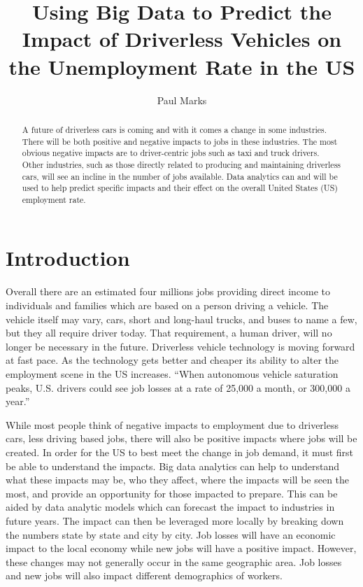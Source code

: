 \documentclass[sigconf]{acmart}
\begin{document}
\title{Using Big Data to Predict the Impact of Driverless Vehicles on the 
Unemployment Rate in the US}


\author{Paul Marks}


\begin{abstract}
A future of driverless cars is coming and with it comes a change in some 
industries.  There will be both positive and negative impacts to jobs in these 
industries.  The most obvious negative impacts are to driver-centric jobs such 
as taxi and truck drivers.  Other industries, such as those directly related to 
producing and maintaining driverless cars, will see an incline in the number of 
jobs available.  Data analytics can and will be used to help predict specific 
impacts and their effect on the overall United States (US) employment rate.
\end{abstract}


\maketitle

\section{Introduction}


Overall there are an estimated four millions jobs\cite{InsuranceJournal} 
providing direct income to individuals and families which are based on a 
person driving a vehicle.  The vehicle itself may vary, cars, short and 
long-haul trucks, and buses to name a few, but they all require driver 
today.  That requirement, a human driver, will no longer be necessary in 
the future.  Driverless vehicle technology is moving forward at fast pace.  
As the technology gets better and cheaper its ability to alter the 
employment scene in the US increases.  ``When autonomous vehicle 
saturation peaks, U.S. drivers could see job losses at a rate of 25,000 
a month, or 300,000 a year.''\cite{CNBC}

While most people think of negative impacts to employment due to driverless 
cars, less driving based jobs, there will also be positive impacts where jobs 
will be created.  In order for the US to best meet the change in job demand, 
it must first be able to understand the impacts.  Big data analytics can help 
to understand what these impacts may be, who they affect, where the impacts 
will be seen the most, and provide an opportunity for those impacted to 
prepare.  This can be aided by data analytic models which can forecast the 
impact to industries in future years.  The impact can then be leveraged more 
locally by breaking down the numbers state by state and city by city.  Job 
losses will have an economic impact to the local economy while new jobs will 
have a positive impact.  However, these changes may not generally occur in 
the same geographic area.  Job losses and new jobs will also impact different 
demographics of workers.
\end{document}
